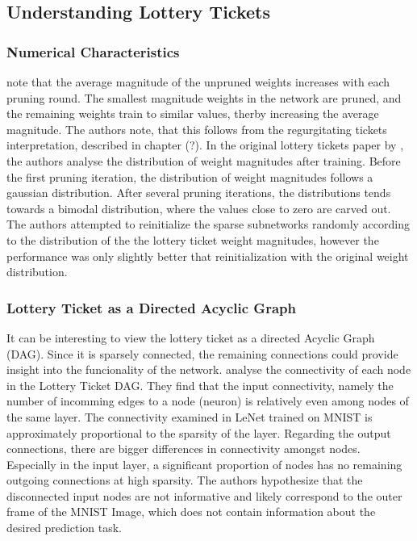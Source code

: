 \subsection{Understanding Lottery Tickets}
\subsubsection{Numerical Characteristics}
\autocite{maene_towards_2021} note that the average magnitude of the unpruned weights increases with each pruning round. The smallest magnitude weights in the network are pruned, and the remaining weights train to similar values, therby increasing the average magnitude. The authors note, that this follows from the regurgitating tickets interpretation, described in chapter (?).
In the original lottery tickets paper by \textcite{DBLP:conf/iclr/FrankleC19}, the authors analyse the distribution of weight magnitudes after training. Before the first pruning iteration, the distribution of weight magnitudes follows a gaussian distribution. After several pruning iterations, the distributions tends towards a bimodal distribution, where the values close to zero are carved out.
The authors attempted to reinitialize the sparse subnetworks randomly according to the distribution of the the lottery ticket weight magnitudes, however the performance was only slightly better that reinitialization with the original weight distribution.

\subsubsection{Lottery Ticket as a Directed Acyclic Graph}
It can be interesting to view the lottery ticket as a directed Acyclic Graph (DAG).
Since it is sparsely connected, the remaining connections could provide insight into the funcionality of the network.
\textcite{DBLP:conf/iclr/FrankleC19} analyse the connectivity of each node in the Lottery Ticket DAG.
They find that the input connectivity, namely the number of incomming edges to a node (neuron) is relatively even among nodes of the same layer.
The connectivity examined in LeNet trained on MNIST is approximately proportional to the sparsity of the layer.
Regarding the output connections, there are bigger differences in connectivity amongst nodes.
Especially in the input layer, a significant proportion of nodes has no remaining outgoing connections at high sparsity. 
The authors hypothesize that the disconnected input nodes are not informative and likely correspond to the outer frame of the MNIST Image, which does not contain information about the desired prediction task.


